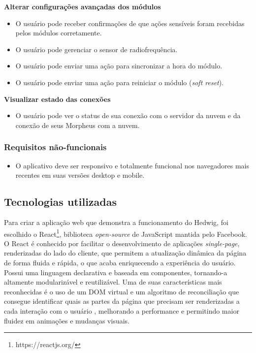 \begin{description}
\item \textbf{Alterar configurações avançadas dos módulos}

\begin{itemize}
\item O usuário pode receber confirmações de que ações sensíveis foram recebidas pelos módulos corretamente.
\item O usuário pode gerenciar o sensor de radiofrequência.
\item O usuário pode enviar uma ação para sincronizar a hora do módulo.
\item O usuário pode enviar uma ação para reiniciar o módulo (\textit{soft reset}).
\end{itemize}

\item \textbf{Visualizar estado das conexões}

\begin{itemize}
\item O usuário pode ver o status de sua conexão com o servidor da nuvem e da conexão de seus Morpheus com a nuvem.
\end{itemize}

\end{description}

\subsubsection{Requisitos não-funcionais}

\begin{itemize}
\item O aplicativo deve ser responsivo e totalmente funcional nos navegadores mais recentes em suas versões desktop e mobile.
\end{itemize}

\subsection{Tecnologias utilizadas}

Para criar a aplicação web que demonstra a funcionamento do Hedwig, foi escolhido o React\footnote{https://reactjs.org/}, biblioteca \emph{open-source} de JavaScript mantida pelo Facebook. O React é conhecido por facilitar o desenvolvimento de aplicações \textit{single-page}, renderizadas do lado do cliente, que permitem a atualização dinâmica da página de forma fluida e rápida, o que acaba enriquecendo a experiência do usuário. Possui uma linguagem declarativa e baseada em componentes, tornando-a altamente modularizável e reutilizável. Uma de suas características mais reconhecidas é o uso de um DOM virtual e um algoritmo de reconciliação que consegue identificar quais as partes da página que precisam ser renderizadas a cada interação com o usuário \cite{reactdiff}, melhorando a performance e permitindo maior fluidez em animações e mudanças visuais.

